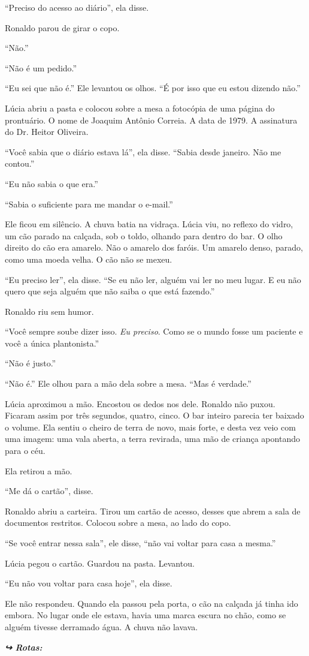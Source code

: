 \noindent ``Preciso do acesso ao diário'', ela disse.

\noindent Ronaldo parou de girar o copo.

\noindent ``Não.''

\noindent ``Não é um pedido.''

\noindent ``Eu sei que não é.'' Ele levantou os olhos. ``É por isso que eu estou dizendo não.''

\noindent Lúcia abriu a pasta e colocou sobre a mesa a fotocópia de uma página do prontuário. O nome de Joaquim Antônio Correia. A data de 1979. A assinatura do Dr. Heitor Oliveira.

\noindent ``Você sabia que o diário estava lá'', ela disse. ``Sabia desde janeiro. Não me contou.''

\noindent ``Eu não sabia o que era.''

\noindent ``Sabia o suficiente para me mandar o e-mail.''

\noindent Ele ficou em silêncio. A chuva batia na vidraça. Lúcia viu, no reflexo do vidro, um cão parado na calçada, sob o toldo, olhando para dentro do bar. O olho direito do cão era amarelo. Não o amarelo dos faróis. Um amarelo denso, parado, como uma moeda velha. O cão não se mexeu.

\noindent ``Eu preciso ler'', ela disse. ``Se eu não ler, alguém vai ler no meu lugar. E eu não quero que seja alguém que não saiba o que está fazendo.''

\noindent Ronaldo riu sem humor.

\noindent ``Você sempre soube dizer isso. \textit{Eu preciso}. Como se o mundo fosse um paciente e você a única plantonista.''

\noindent ``Não é justo.''

\noindent ``Não é.'' Ele olhou para a mão dela sobre a mesa. ``Mas é verdade.''

\noindent Lúcia aproximou a mão. Encostou os dedos nos dele. Ronaldo não puxou. Ficaram assim por três segundos, quatro, cinco. O bar inteiro parecia ter baixado o volume. Ela sentiu o cheiro de terra de novo, mais forte, e desta vez veio com uma imagem: uma vala aberta, a terra revirada, uma mão de criança apontando para o céu.

\noindent Ela retirou a mão.

\noindent ``Me dá o cartão'', disse.

\noindent Ronaldo abriu a carteira. Tirou um cartão de acesso, desses que abrem a sala de documentos restritos. Colocou sobre a mesa, ao lado do copo.

\noindent ``Se você entrar nessa sala'', ele disse, ``não vai voltar para casa a mesma.''

\noindent Lúcia pegou o cartão. Guardou na pasta. Levantou.

\noindent ``Eu não vou voltar para casa hoje'', ela disse.

\noindent Ele não respondeu. Quando ela passou pela porta, o cão na calçada já tinha ido embora. No lugar onde ele estava, havia uma marca escura no chão, como se alguém tivesse derramado água. A chuva não lavava.

\noindent\textit{\textbf{↪ Rotas:}  \rotasep {} \rotasep {}}
